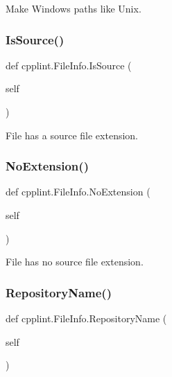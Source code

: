 \begin{DoxyVerb}Make Windows paths like Unix.\end{DoxyVerb}
 \mbox{\label{classcpplint_1_1FileInfo_a157f8d3266d7291321db88cdad3b2879}} 
\subsubsection{\texorpdfstring{Is\+Source()}{IsSource()}}
{\footnotesize\ttfamily def cpplint.\+File\+Info.\+Is\+Source (\begin{DoxyParamCaption}\item[{}]{self }\end{DoxyParamCaption})}

\begin{DoxyVerb}File has a source file extension.\end{DoxyVerb}
 \mbox{\label{classcpplint_1_1FileInfo_acb46555a72b346966f4bf28c08e3b1fa}} 
\subsubsection{\texorpdfstring{No\+Extension()}{NoExtension()}}
{\footnotesize\ttfamily def cpplint.\+File\+Info.\+No\+Extension (\begin{DoxyParamCaption}\item[{}]{self }\end{DoxyParamCaption})}

\begin{DoxyVerb}File has no source file extension.\end{DoxyVerb}
 \mbox{\label{classcpplint_1_1FileInfo_a2b3b79b7d46221a6b9d0ea0bebac2061}} 
\subsubsection{\texorpdfstring{Repository\+Name()}{RepositoryName()}}
{\footnotesize\ttfamily def cpplint.\+File\+Info.\+Repository\+Name (\begin{DoxyParamCaption}\item[{}]{self }\end{DoxyParamCaption})}

